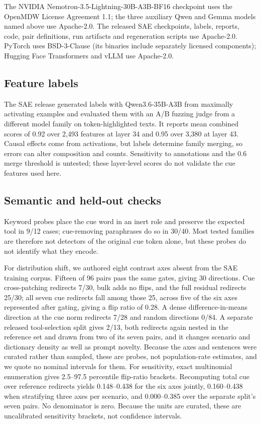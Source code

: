 \documentclass{article}
\begin{document}
The NVIDIA Nemotron-3.5-Lightning-30B-A3B-BF16 checkpoint uses the OpenMDW License
Agreement 1.1; the three auxiliary Qwen and Gemma models named above use
Apache-2.0.
The released SAE checkpoints, labels, reports, code, pair definitions, run
artifacts and regeneration scripts use Apache-2.0.
PyTorch uses BSD-3-Clause (its binaries include separately licensed
components); Hugging Face Transformers and vLLM use Apache-2.0.

\subsection{Feature labels}

The SAE release generated labels with Qwen3.6-35B-A3B from maximally
activating examples and evaluated them with an A/B fuzzing judge from a
different model family on token-highlighted texts. It reports mean combined scores of 0.92 over 2,493
features at layer 34 and 0.95 over 3,380 at layer 43. Causal effects come from
activations, but labels determine family merging, so errors can alter
composition and counts. Sensitivity to annotations and the 0.6 merge threshold
is untested; these layer-level scores do not validate the cue features used here.

\subsection{Semantic and held-out checks}

Keyword probes place the cue word in an inert role and preserve the expected
tool in 9/12 cases; cue-removing paraphrases do so in 30/40. Most tested
families are therefore not detectors of the original cue token alone, but these
probes do not identify what they encode.

For distribution shift, we authored eight contrast axes absent from the SAE
training corpus. Fifteen of 96 pairs pass the same gates, giving 30 directions.
Cue cross-patching redirects 7/30, bulk adds no flips, and the full residual
redirects 25/30; all seven cue redirects fall among those 25, across five of
the six axes represented after gating, giving a flip ratio of 0.28. A dense
difference-in-means direction at the cue norm redirects 7/28 and random
directions 0/84. A separate released tool-selection split gives 2/13, both
redirects again nested in the reference set and drawn from two of its seven
pairs, and it changes scenario and dictionary density as well as prompt
novelty. Because the axes and sentences were curated rather than sampled, these
are probes, not population-rate estimates, and we quote no nominal intervals
for them. For sensitivity, exact multinomial enumeration gives 2.5--97.5
percentile flip-ratio brackets. Recomputing total cue over reference redirects
yields 0.148--0.438 for the six axes jointly, 0.160--0.438 when stratifying
three axes per scenario, and 0.000--0.385 over the separate split's seven pairs.
No denominator is zero. Because the units are curated, these are uncalibrated
sensitivity brackets, not confidence intervals.

\clearpage

\end{document}
